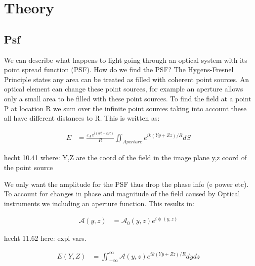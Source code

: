 \chapter{Theory} %


\section{Psf}

We can describe what happens to light going through an optical system with its point spread function (PSF). How do we find the PSF? The Hygens-Fresnel Principle states any area can be treated as filled with coherent point sources. An optical element can change these point sources, for example an aperture allows only a small area to be filled with these point sources. To find the field at a point P at location R we sum over the infinite point sources taking into account these all have different distances to R. This is written as:

\begin{subequations}
    \begin{align}
        E &= \frac{\varepsilon_A e^{i(wt-kR)}}{R} \iint_{Aperture} e^{ik(Yy+Zz)/R} dS
    \end{align}
\end{subequations}

hecht 10.41
where: Y,Z are the coord of the field in the image plane
y,z coord of the point source

We only want the amplitude for the PSF thus drop the phase info (e power etc). To account for changes in phase and magnitude of the field caused by Optical instruments we including an aperture function. This results in:


\begin{subequations}
  \begin{align}
    \mathscr{A}(y,z) &= \mathscr{A}_0 (y,z)e^{i\upphi(y,z)}
  \end{align}
\end{subequations}

hecht 11.62
here: expl vars.  

\begin{subequations}
  \begin{align}
    E(Y,Z) &= \iint_{-\infty}^{\infty} \mathscr{A}(y,z) e^{ik(Yy+Zz)/R} dydz
  \end{align}
\end{subequations}

